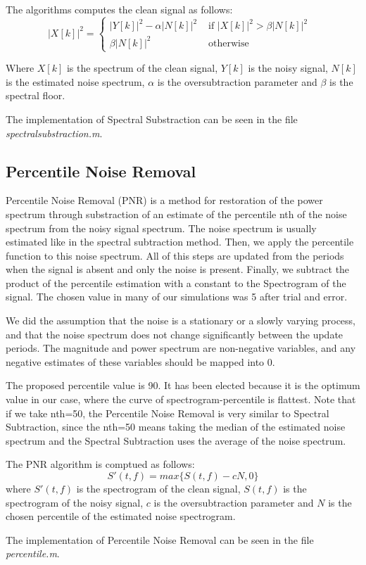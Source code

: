  The algorithms computes the clean signal as follows:
  \begin{dmath}
    |X[k]|^2 = \left\{  \begin{array}{rl}
      |Y[k]|^2-\alpha |N[k]|^2    &\mbox{ if  $|X[k]|^2>\beta |N[k]|^2$ } \\
      \beta |N[k]|^2   &\mbox{ otherwise } 
    \end{array} \right.
  \end{dmath}
  
  Where $X[k]$ is the spectrum of the clean signal, $Y[k]$ is the noisy signal, $N[k]$ is the estimated noise spectrum, $\alpha$ is the oversubtraction parameter and $\beta$ is the spectral floor.
  
  The implementation of Spectral Substraction can be seen in the file \emph{spectralsubstraction.m}\cite{spectralsubstraction.m}.

\subsection{Percentile Noise Removal}
  Percentile Noise Removal (PNR) is a method for restoration of the power spectrum through substraction of an estimate of the percentile nth of the noise spectrum from the noisy signal spectrum. The noise spectrum is usually estimated like in the spectral subtraction method. Then, we apply the percentile function to this noise spectrum. All of this steps are updated from the periods when the signal is absent and only the noise is present. Finally, we subtract the product of the percentile estimation with a constant to the Spectrogram of the signal. The chosen value in many of our simulations was 5 after trial and error.

  We did the assumption that the noise is a stationary or a slowly varying process, and that the noise spectrum does not change significantly between the update periods. The magnitude and power spectrum are non-negative variables, and any negative estimates of these variables should be mapped into 0. 

  The proposed percentile value is 90. It has been elected because it is the optimum value in our case, where the curve of spectrogram-percentile is flattest. Note that if we take nth=50, the Percentile Noise Removal is very similar to Spectral Subtraction, since the nth=50 means taking the median of the estimated noise spectrum and the Spectral Subtraction uses the average of the noise spectrum.
  
  The PNR algorithm is comptued as follows:
  \begin{dmath}
    S'(t,f)= max\{S(t,f)- c N,0\}
  \end{dmath}
  where $S'(t,f)$ is the spectrogram of the clean signal, $S(t,f)$ is the spectrogram of the noisy signal, $c$ is the oversubtraction parameter and $N$ is the chosen percentile of the estimated noise spectrogram.
  
  The implementation of Percentile Noise Removal can be seen in the file \emph{percentile.m}\cite{percentile.m}.
